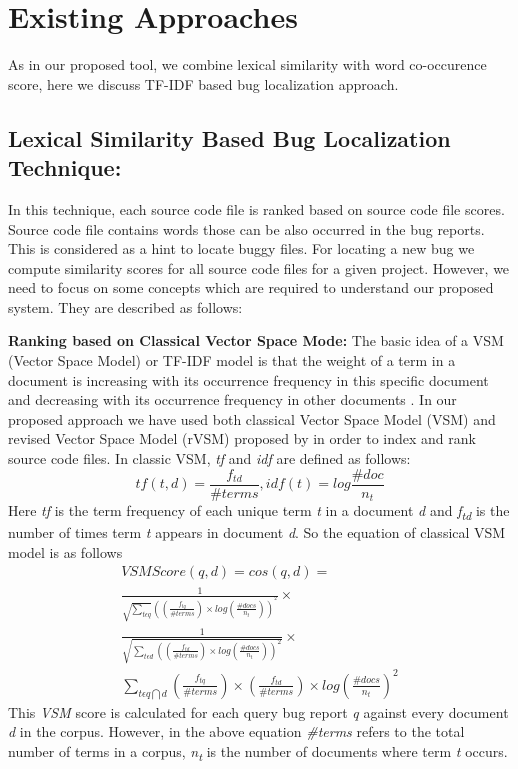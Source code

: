\documentclass[conference]{IEEEtran}
\begin{document}
\section{Existing Approaches}\label{sec:existing}
As in our proposed tool, we combine lexical similarity with word co-occurence score, here we discuss TF-IDF based bug localization approach.
\subsection{Lexical Similarity Based Bug Localization Technique:}
In this technique, each source code file is ranked based on source code file scores. Source code file contains words those can be also occurred in the bug reports. This is considered as a hint to locate buggy files. 
For locating a new bug we compute similarity scores for all source code files for a given project. However, we need to focus on some concepts which are required to understand our proposed system. They are described as follows:

\textbf{Ranking based on Classical Vector Space Mode:}
The basic idea of a VSM (Vector Space Model) or TF-IDF model is that the weight of a term in a document is increasing with its occurrence frequency in this specific document and decreasing with its occurrence frequency in other documents \cite{Jian}.
In our proposed approach we have used both classical Vector Space Model (VSM) and revised Vector Space Model (rVSM) proposed by \citet{Jian} in order to index and rank source code files. 
In classic VSM, \textit{tf} and \textit{idf} are defined as follows:
\begin{equation}
tf(t,d)=\frac{f_{td}}{\#terms}, idf(t)=log\frac{\#doc}{n_{t}}
\end{equation}
Here \textit{tf} is the term frequency of each unique term \textit{t} in a document \textit{d} and \textit{f\textsubscript{td}} is the number of times term \textit{t} appears in document \textit{d}.
So the equation of classical VSM model is as follows
\begin{multline}\label{VSMequation}
VSMScore(q,d)= cos(q,d) =
\\
\frac{1}{\sqrt{\sum_{t\epsilon q}}((\frac{f_{tq}}{\#terms})\times log(\frac{\#docs}{n_{t}}))^{^{2}}}\times 
\\
\frac{1}{\sqrt{\sum_{t\epsilon d}((\frac{f_{td}}{\#terms})\times log(\frac{\#docs}{n_{t}}))^{2}}}\times
\\
\sum_{t\epsilon q\bigcap d}(\frac{f_{tq}}{\#terms})\times (\frac{f_{td}}{\#terms})\times log(\frac{\#docs}{n_{t}})^{2}
\end{multline}
This \textit{VSM} score is calculated for each query bug report \textit{q} against every document \textit{d} in the corpus. However, in the above equation \textit{\#terms} refers to the total number of terms in a corpus, \textit{n\textsubscript{t}} is the number of documents where term \textit{t} occurs.
\end{document}
